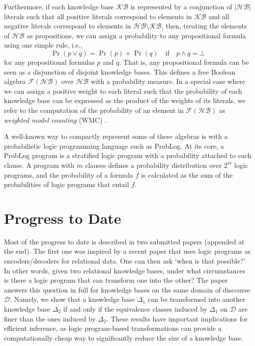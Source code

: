 \documentclass{article}
\begin{document}
Furthermore, if each knowledge base $\mathcal{KB}$ is represented by a
conjunction of $|\mathcal{HB}|$ literals such that all positive literals
correspond to elements in $\mathcal{KB}$ and all negative literals correspond to
elements in $\mathcal{HB} \setminus \mathcal{KB}$, then, treating the elements
of $\mathcal{HB}$ as propositions, we can assign a probability to any
propositional formula using one simple rule, i.e.,
\[
  \Pr(p \lor q) = \Pr(p) + \Pr(q) \quad \text{if} \quad p \land q = \bot
\]
for any propositional formulas $p$ and $q$. That is, any propositional formula
can be seen as a disjunction of disjoint knowledge bases. This defines a
free Boolean algebra $\mathscr{F}(\mathcal{HB})$ over $\mathcal{HB}$ with a
probability measure. In a special case where we can assign a positive weight to
each literal such that the probability of each knowledge base can be expressed
as the product of the weights of its literals, we refer to the computation of
the probability of an element in $\mathscr{F}(\mathcal{HB})$ as \emph{weighted
  model counting} (WMC) \cite{DBLP:journals/ai/ChaviraD08}.

A well-known way to compactly represent some of these algebras is with a
probabilistic logic programming language such as ProbLog. At its core, a ProbLog
program is a stratified logic program with a probability attached to each
clause. A program with $m$ clauses defines a probability distribution over $2^m$
logic programs, and the probability of a formula $f$ is calculated as the sum of
the probabilities of logic programs that entail $f$.

\section{Progress to Date}

Most of the progress to date is described in two submitted papers (appended at
the end). The first one was inspired by a recent paper
\cite{DBLP:conf/ijcai/DumancicGMB19} that uses logic programs as
encoders/decoders for relational data. One can then ask `when is that
possible?' In other words, given two relational knowledge bases, under what
circumstances is there a logic program that can transform one into the other?
The paper answers this question in full for knowledge bases on the same domain
of discourse $\mathcal{D}$. Namely, we show that a knowledge base $\Delta_1$ can
be transformed into another knowledge base $\Delta_2$ if and only if the
equivalence classes induced by $\Delta_1$ on $\mathcal{D}$ are finer than the
ones induced by $\Delta_2$. These results have important implications for
efficient inference, as logic program-based transformations can provide a
computationally cheap way to significantly reduce the size of a knowledge
base.
\end{document}
